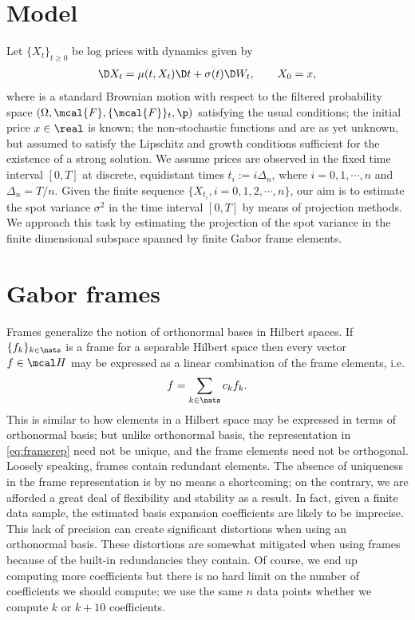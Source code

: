 \section{Model} \label{sec:model}
Let $\{X_t\}_{t\ge 0}$ be  log prices with dynamics given by  
\begin{align}
  \D X_t =   \mu(t, X_t) \D t + \sigma(t) \D W_t, \qquad X_0 = x,  
  \label{eq:pdynamics}
\end{align}
where \sbm is a standard Brownian motion with respect to the filtered probability space $(\Omega, \mcal{F}, \{\mcal{F}\}_t, \p)$ satisfying the usual conditions; the initial price $x \in \real$ is known; the non-stochastic functions \idp and \ivp are as yet unknown, but assumed to satisfy the Lipschitz and growth conditions sufficient for the existence of a strong solution. We assume prices are observed in the fixed time interval  $[0,T]$ at discrete, equidistant times $t_i := i\Delta_n$, where  $i= 0,1,\cdots,n$ and $\Delta_n = T/n$. Given the finite sequence  $\{X_{t_i}, i=0,1,2,\cdots,n\}$, our aim is to estimate the spot variance $\sigma^2$ in the time interval $[0,T]$ by means of projection methods. We approach this task  by estimating the projection  of the spot variance in  the finite dimensional subspace spanned by finite Gabor frame elements.  
\section{Gabor frames}\label{sec:gabor} 
Frames generalize the notion of orthonormal bases in  Hilbert spaces. If $\{f_k\}_{k \in \nats}$ is a frame for a separable Hilbert space \hs then every vector $f \in \hs$ may be expressed as a linear combination of the frame elements, i.e.
\begin{align}
  f = \sumn c_k f_k.
  \label{eq:framerep}
\end{align}
This is similar to how elements in a Hilbert space may be expressed in terms of orthonormal basis; but unlike orthonormal basis, the representation in \eqref{eq:framerep} need not be unique, and the frame elements need not be orthogonal. Loosely speaking, frames contain redundant elements. The absence of uniqueness in the frame representation is by no means a shortcoming; on the contrary, we are afforded a great deal of flexibility and stability as a result. In fact, given a finite data sample, the estimated basis expansion coefficients are likely to be imprecise. This lack of precision can create significant distortions when using an orthonormal basis. These distortions are somewhat mitigated when using frames because of the built-in redundancies  they contain. Of course, we end up computing more coefficients but there is no hard limit on the number of coefficients we should compute; we use the same $n$ data points whether we compute $k$ or $k+ 10$ coefficients.   



